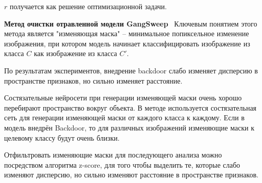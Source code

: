$r$ получается как решение оптимизационной задачи.



\textbf{Метод очистки отравленной модели GangSweep}~\cite{zhu_gangsweep_2020}
Ключевым понятием этого метода является "изменяющая маска" – минимальное попиксельное изменение изображения, при котором модель начинает классифицировать изображение из класса $C$ как изображение из класса $C'$.

По результатам экспериментов, внедрение backdoor слабо изменяет дисперсию в пространстве признаков, но сильно изменяет расстояние.

Состязательные нейросети при генерации изменяющей маски очень хорошо перебирают
пространство вокруг объекта. В методе используется состязательная сеть
для генерации изменяющей маски от каждого класса к каждому.
Если в модель внедрён Backdoor, то для различных изображений изменяющие маски к целевому классу будут очень близки.

Отфильтровать изменяющие маски для последующего анализа можно посредством алгоритма z-score, для того чтобы выделить те, которые слабо изменяют дисперсию, но сильно изменяют расстояние в пространстве признаков.


